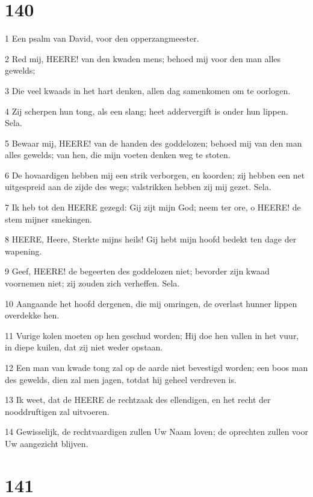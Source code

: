 \chapter{140}

\par 1 Een psalm van David, voor den opperzangmeester.
\par 2 Red mij, HEERE! van den kwaden mens; behoed mij voor den man alles gewelds;
\par 3 Die veel kwaads in het hart denken, allen dag samenkomen om te oorlogen.
\par 4 Zij scherpen hun tong, als een slang; heet addervergift is onder hun lippen. Sela.
\par 5 Bewaar mij, HEERE! van de handen des goddelozen; behoed mij van den man alles gewelds; van hen, die mijn voeten denken weg te stoten.
\par 6 De hovaardigen hebben mij een strik verborgen, en koorden; zij hebben een net uitgespreid aan de zijde des wegs; valstrikken hebben zij mij gezet. Sela.
\par 7 Ik heb tot den HEERE gezegd: Gij zijt mijn God; neem ter ore, o HEERE! de stem mijner smekingen.
\par 8 HEERE, Heere, Sterkte mijns heils! Gij hebt mijn hoofd bedekt ten dage der wapening.
\par 9 Geef, HEERE! de begeerten des goddelozen niet; bevorder zijn kwaad voornemen niet; zij zouden zich verheffen. Sela.
\par 10 Aangaande het hoofd dergenen, die mij omringen, de overlast hunner lippen overdekke hen.
\par 11 Vurige kolen moeten op hen geschud worden; Hij doe hen vallen in het vuur, in diepe kuilen, dat zij niet weder opstaan.
\par 12 Een man van kwade tong zal op de aarde niet bevestigd worden; een boos man des gewelds, dien zal men jagen, totdat hij geheel verdreven is.
\par 13 Ik weet, dat de HEERE de rechtzaak des ellendigen, en het recht der nooddruftigen zal uitvoeren.
\par 14 Gewisselijk, de rechtvaardigen zullen Uw Naam loven; de oprechten zullen voor Uw aangezicht blijven.

\chapter{141}

